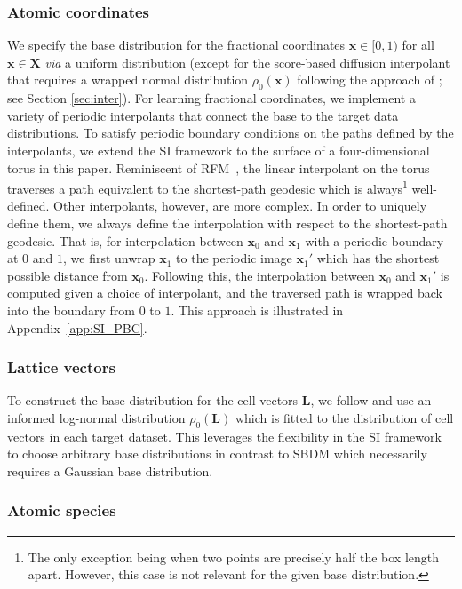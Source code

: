 \subsubsection{Atomic coordinates}
We specify the base distribution for the fractional coordinates $\bm{x} \in [0,1)$ for all $\bm{x} \in \bm{X}$ \textit{via} a uniform distribution (except for the score-based diffusion interpolant that requires a wrapped normal distribution $\rho_{0}(\bm{x})$ following the approach of \citet{jiao_crystal_2023}; see Section \ref{sec:inter}). 
For learning fractional coordinates, we implement a variety of periodic interpolants that connect the base to the target data distributions.
To satisfy periodic boundary conditions on the paths defined by the interpolants, we extend the SI framework to the surface of a four-dimensional torus in this paper.
Reminiscent of RFM~\citep{chen_flow_2024}, the linear interpolant on the torus traverses a path equivalent to the shortest-path geodesic which is always\footnote{The only exception being when two points are precisely half the box length apart. However, this case is not relevant for the given base distribution.} well-defined. Other interpolants, however, are more complex. In order to uniquely define them, we always define the interpolation with respect to the shortest-path geodesic.
That is, for interpolation between $\bm{x}_0$ and $\bm{x}_1$ with a periodic boundary at 0 and $1$, we first unwrap $\bm{x}_1$ to the periodic image $\bm{x}_1'$ which has the shortest possible distance from $\bm{x}_0$.
Following this, the interpolation between $\bm{x}_0$ and $\bm{x}_1'$ is computed given a choice of interpolant, and the traversed path is wrapped back into the boundary from $0$ to $1$. This approach is illustrated in Appendix~\ref{app:SI_PBC}.

\subsubsection{Lattice vectors}
To construct the base distribution for the cell vectors $\bm{L}$, we follow \citet{miller_flowmm_2024} and use an informed log-normal distribution $\rho_{0}(\bm{L})$ which is fitted to the distribution of cell vectors in each target dataset. This leverages the flexibility in the SI framework to choose arbitrary base distributions in contrast to SBDM which necessarily requires a Gaussian base distribution.

\subsubsection{Atomic species}

